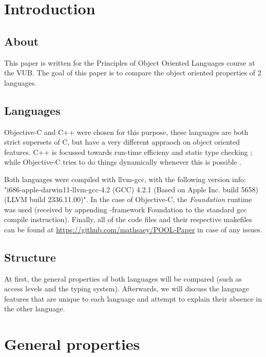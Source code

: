 \documentclass[11pt, a4paper, twocolumn]{article}
\begin{document}
\setlength{\parindent}{0pt}
\setlength{\parskip}{1ex}


\tableofcontents

\section{Introduction}
\subsection{About}
This paper is written for the Principles of Object Oriented Languages course at the VUB. The goal of this paper is to compare the object oriented properties of 2 languages. 

\subsection{Languages}
Objective-C and C++ were chosen for this purpose, these languages are both strict supersets of C, but have a very different appraoch on object oriented features. C++ is focussed towards run-time efficieny and static type checking \cite{CPdesc}; while Objective-C tries to do things dynamically whenever this is possible \cite{OCRPG}.

Both languages were compiled with llvm-gcc, with the following version info: "i686-apple-darwin11-llvm-gcc-4.2 (GCC) 4.2.1 (Based on Apple Inc. build 5658) (LLVM build 2336.11.00)". In the case of Objective-C, the \textit{Foundation} runtime was used (received by appending -framework Foundation to the standard gcc compile instruction). Finally, all of the code files and their respective makefiles can be found at \url{https://github.com/mathsaey/POOL-Paper} in case of any issues.

\subsection{Structure}
At first, the general properties of both languages will be compared (such as access levels and the typing system). Afterwards, we will discuss the language features that are unique to each language and attempt to explain their absence in the other language.

\section{General properties}
\label{sec:general}
\end{document}
